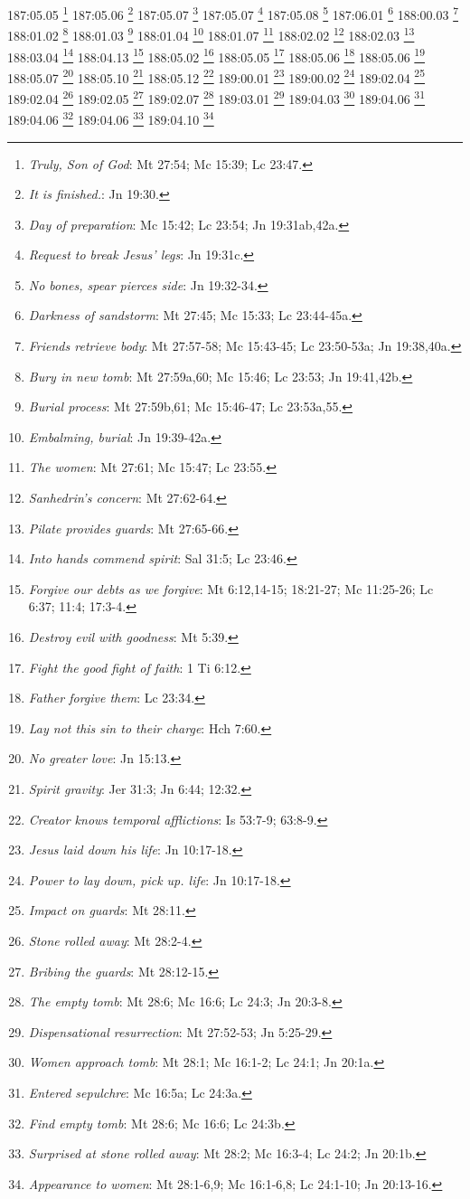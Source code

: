 187:05.05 \footnote{\textit{Truly, Son of God}: Mt 27:54; Mc 15:39; Lc 23:47.}
187:05.06 \footnote{\textit{It is finished.}: Jn 19:30.}
187:05.07 \footnote{\textit{Day of preparation}: Mc 15:42; Lc 23:54; Jn 19:31ab,42a.}
187:05.07 \footnote{\textit{Request to break Jesus' legs}: Jn 19:31c.}
187:05.08 \footnote{\textit{No bones, spear pierces side}: Jn 19:32-34.}
187:06.01 \footnote{\textit{Darkness of sandstorm}: Mt 27:45; Mc 15:33; Lc 23:44-45a.}
188:00.03 \footnote{\textit{Friends retrieve body}: Mt 27:57-58; Mc 15:43-45; Lc 23:50-53a; Jn 19:38,40a.}
188:01.02 \footnote{\textit{Bury in new tomb}: Mt 27:59a,60; Mc 15:46; Lc 23:53; Jn 19:41,42b.}
188:01.03 \footnote{\textit{Burial process}: Mt 27:59b,61; Mc 15:46-47; Lc 23:53a,55.}
188:01.04 \footnote{\textit{Embalming, burial}: Jn 19:39-42a.}
188:01.07 \footnote{\textit{The women}: Mt 27:61; Mc 15:47; Lc 23:55.}
188:02.02 \footnote{\textit{Sanhedrin's concern}: Mt 27:62-64.}
188:02.03 \footnote{\textit{Pilate provides guards}: Mt 27:65-66.}
188:03.04 \footnote{\textit{Into hands commend spirit}: Sal 31:5; Lc 23:46.}
188:04.13 \footnote{\textit{Forgive our debts as we forgive}: Mt 6:12,14-15; 18:21-27; Mc 11:25-26; Lc 6:37; 11:4; 17:3-4.}
188:05.02 \footnote{\textit{Destroy evil with goodness}: Mt 5:39.}
188:05.05 \footnote{\textit{Fight the good fight of faith}: 1 Ti 6:12.}
188:05.06 \footnote{\textit{Father forgive them}: Lc 23:34.}
188:05.06 \footnote{\textit{Lay not this sin to their charge}: Hch 7:60.}
188:05.07 \footnote{\textit{No greater love}: Jn 15:13.}
188:05.10 \footnote{\textit{Spirit gravity}: Jer 31:3; Jn 6:44; 12:32.}
188:05.12 \footnote{\textit{Creator knows temporal afflictions}: Is 53:7-9; 63:8-9.}
189:00.01 \footnote{\textit{Jesus laid down his life}: Jn 10:17-18.}
189:00.02 \footnote{\textit{Power to lay down, pick up. life}: Jn 10:17-18.}
189:02.04 \footnote{\textit{Impact on guards}: Mt 28:11.}
189:02.04 \footnote{\textit{Stone rolled away}: Mt 28:2-4.}
189:02.05 \footnote{\textit{Bribing the guards}: Mt 28:12-15.}
189:02.07 \footnote{\textit{The empty tomb}: Mt 28:6; Mc 16:6; Lc 24:3; Jn 20:3-8.}
189:03.01 \footnote{\textit{Dispensational resurrection}: Mt 27:52-53; Jn 5:25-29.}
189:04.03 \footnote{\textit{Women approach tomb}: Mt 28:1; Mc 16:1-2; Lc 24:1; Jn 20:1a.}
189:04.06 \footnote{\textit{Entered sepulchre}: Mc 16:5a; Lc 24:3a.}
189:04.06 \footnote{\textit{Find empty tomb}: Mt 28:6; Mc 16:6; Lc 24:3b.}
189:04.06 \footnote{\textit{Surprised at stone rolled away}: Mt 28:2; Mc 16:3-4; Lc 24:2; Jn 20:1b.}
189:04.10 \footnote{\textit{Appearance to women}: Mt 28:1-6,9; Mc 16:1-6,8; Lc 24:1-10; Jn 20:13-16.}
